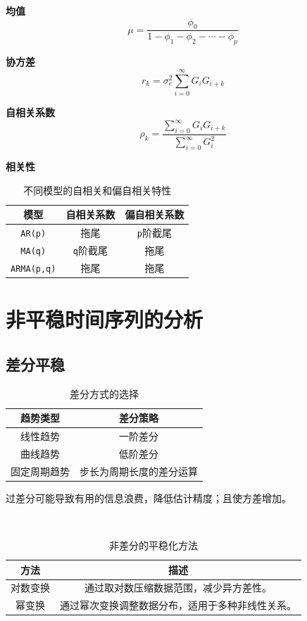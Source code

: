 \documentclass{article} %
\begin{document}
\textbf{均值}
\[
\mu=\dfrac{\phi_0}{1-\phi_1-\phi_2-\cdots-\phi_p}
\]

\textbf{协方差}
\[
r_k=\sigma_e^2\sum_{i=0}^{\infty}G_iG_{i+k}
\]

\textbf{自相关系数}
\[
\rho_k=\dfrac{\sum_{i=0}^{\infty}G_iG_{i+k}}{\sum_{i=0}^{\infty}G_i^2}
\]

\textbf{相关性}

\begin{table}[h]
\centering
\begin{tabular}{c|cc}
\hline
    模型     & 自相关系数 & 偏自相关系数 \\
\hline
   \texttt{AR(p)}   &    拖尾    &  \texttt{p}阶截尾   \\
   \texttt{MA(q)}   & \texttt{q}阶截尾  &     拖尾     \\
 \texttt{ARMA(p,q)} &    拖尾    &     拖尾     \\
\hline
\end{tabular}
\caption{不同模型的自相关和偏自相关特性}
\end{table}

\section{非平稳时间序列的分析}

\subsection{差分平稳}

\begin{table}[H]
  \centering
  
  \label{tab:differencing_choices}
  \begin{tabular}{|c|c|}
  \hline
  \textbf{趋势类型} & \textbf{差分策略} \\ \hline
  线性趋势       & 一阶差分         \\ \hline
  曲线趋势       & 低阶差分         \\ \hline
  固定周期趋势   & 步长为周期长度的差分运算 \\ \hline
  \end{tabular}
  \caption{差分方式的选择}
\end{table}

过差分可能导致有用的信息浪费，降低估计精度；且使方差增加。

\begin{table}[H]
  \centering
  \
  \begin{tabular}{|c|c|}
  \hline
  \textbf{方法} & \textbf{描述} \\ \hline
  对数变换     & 通过取对数压缩数据范围，减少异方差性。 \\ \hline
  幂变换       & 通过幂次变换调整数据分布，适用于多种非线性关系。 \\ \hline
  \end{tabular}
  \caption{非差分的平稳化方法}
\end{table}
\end{document}
